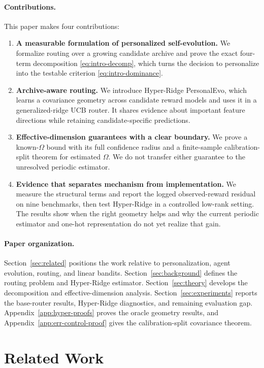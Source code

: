 \documentclass{article} %
\begin{document}
\paragraph{Contributions.}
This paper makes four contributions:
\begin{enumerate}
\item \textbf{A measurable formulation of personalized self-evolution.} We formalize routing over a growing candidate archive and prove the exact four-term decomposition \eqref{eq:intro-decomp}, which turns the decision to personalize into the testable criterion \eqref{eq:intro-dominance}.
\item \textbf{Archive-aware routing.} We introduce Hyper-Ridge PersonalEvo, which learns a covariance geometry across candidate reward models and uses it in a generalized-ridge UCB router. It shares evidence about important feature directions while retaining candidate-specific predictions.
\item \textbf{Effective-dimension guarantees with a clear boundary.} We prove a known-$\Omega$ bound with its full confidence radius and a finite-sample calibration-split theorem for estimated $\Omega$. We do not transfer either guarantee to the unresolved periodic estimator.
\item \textbf{Evidence that separates mechanism from implementation.} We measure the structural terms and report the logged observed-reward residual on nine benchmarks, then test Hyper-Ridge in a controlled low-rank setting. The results show when the right geometry helps and why the current periodic estimator and one-hot representation do not yet realize that gain.
\end{enumerate}

\paragraph{Paper organization.}
Section~\ref{sec:related} positions the work relative to personalization, agent evolution, routing, and linear bandits. Section~\ref{sec:background} defines the routing problem and Hyper-Ridge estimator. Section~\ref{sec:theory} develops the decomposition and effective-dimension analysis. Section~\ref{sec:experiments} reports the base-router results, Hyper-Ridge diagnostics, and remaining evaluation gap. Appendix~\ref{app:hyper-proofs} proves the oracle geometry results, and Appendix~\ref{app:err-control-proof} gives the calibration-split covariance theorem.

\section{Related Work}
\end{document}
